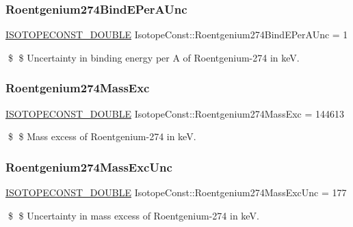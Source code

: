 \subsubsection{\texorpdfstring{Roentgenium274\+Bind\+E\+Per\+A\+Unc}{Roentgenium274BindEPerAUnc}}
{\footnotesize\ttfamily \mbox{\hyperlink{group___isotope_const-_macros_ga8f45a7272ce02c0b4c65c44636ed719a}{I\+S\+O\+T\+O\+P\+E\+C\+O\+N\+S\+T\+\_\+\+D\+O\+U\+B\+LE}} Isotope\+Const\+::\+Roentgenium274\+Bind\+E\+Per\+A\+Unc = 1}

\$ \$ Uncertainty in binding energy per A of Roentgenium-\/274 in keV. \mbox{\label{group___isotope_const-_roentgenium-_rg274_ga929c8aed4112f249abf0b81267e6bc05}} 
\subsubsection{\texorpdfstring{Roentgenium274\+Mass\+Exc}{Roentgenium274MassExc}}
{\footnotesize\ttfamily \mbox{\hyperlink{group___isotope_const-_macros_ga8f45a7272ce02c0b4c65c44636ed719a}{I\+S\+O\+T\+O\+P\+E\+C\+O\+N\+S\+T\+\_\+\+D\+O\+U\+B\+LE}} Isotope\+Const\+::\+Roentgenium274\+Mass\+Exc = 144613}

\$ \$ Mass excess of Roentgenium-\/274 in keV. \mbox{\label{group___isotope_const-_roentgenium-_rg274_gaf22d48484f7702ee9ce56faf0f8ffc74}} 
\subsubsection{\texorpdfstring{Roentgenium274\+Mass\+Exc\+Unc}{Roentgenium274MassExcUnc}}
{\footnotesize\ttfamily \mbox{\hyperlink{group___isotope_const-_macros_ga8f45a7272ce02c0b4c65c44636ed719a}{I\+S\+O\+T\+O\+P\+E\+C\+O\+N\+S\+T\+\_\+\+D\+O\+U\+B\+LE}} Isotope\+Const\+::\+Roentgenium274\+Mass\+Exc\+Unc = 177}

\$ \$ Uncertainty in mass excess of Roentgenium-\/274 in keV. \mbox{\label{group___isotope_const-_roentgenium-_rg274_ga3ff6a97e50aa2b422cd34affb4113f12}} 
